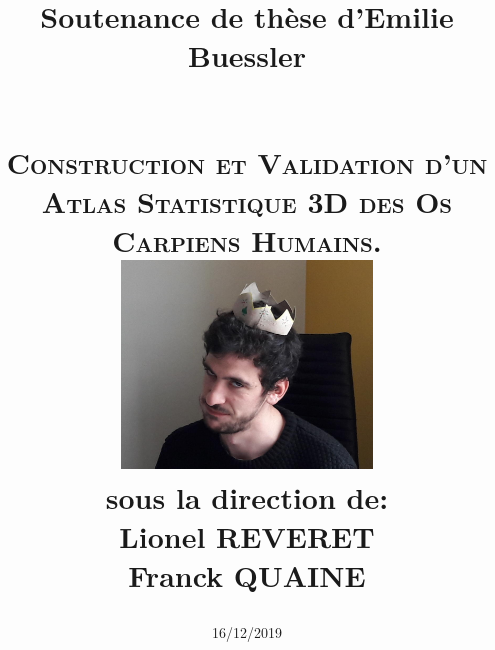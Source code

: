 \documentclass[a4paper]{leaflet}
\begin{document}
\begin{titlepage}
  \title{
    Soutenance de thèse d'Emilie Buessler
    \date{16/12/2019} \\
    \textsc{Construction et Validation d'un Atlas Statistique 3D des Os Carpiens Humains.}\\[1cm]    
    \includegraphics[width=0.5\textwidth]{crop} \\
 sous la direction de: \\
Lionel REVERET \\
Franck QUAINE \\
}
\end{titlepage}

\maketitle

\newpage
\end{document}
